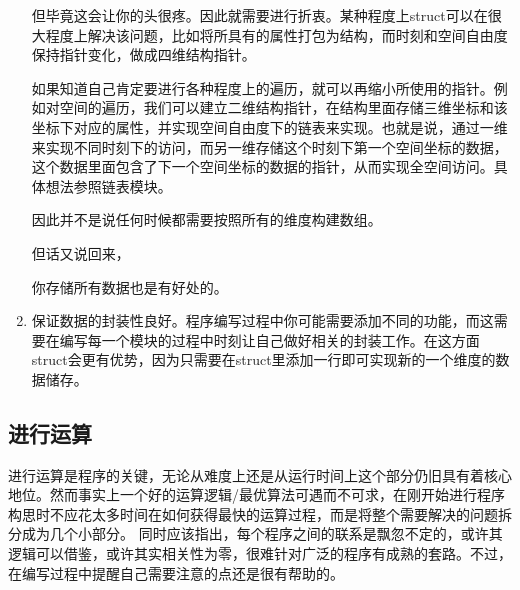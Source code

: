 \documentclass[12pt,a4paper]{article}
\begin{document}
\begin{enumerate}
但毕竟这会让你的头很疼。因此就需要进行折衷。某种程度上struct可以在很大程度上解决该问题，比如将所具有的属性打包为结构，而时刻和空间自由度保持指针变化，做成四维结构指针。

如果知道自己肯定要进行各种程度上的遍历，就可以再缩小所使用的指针。例如对空间的遍历，我们可以建立二维结构指针，在结构里面存储三维坐标和该坐标下对应的属性，并实现空间自由度下的链表来实现。也就是说，通过一维来实现不同时刻下的访问，而另一维存储这个时刻下第一个空间坐标的数据，这个数据里面包含了下一个空间坐标的数据的指针，从而实现全空间访问。具体想法参照链表模块。

因此并不是说任何时候都需要按照所有的维度构建数组。

但话又说回来，

{\Large 你存储所有数据也是有好处的。}

\item 保证数据的封装性良好。程序编写过程中你可能需要添加不同的功能，而这需要在编写每一个模块的过程中时刻让自己做好相关的封装工作。在这方面struct会更有优势，因为只需要在struct里添加一行即可实现新的一个维度的数据储存。
\end{enumerate}

\subsection{进行运算}

进行运算是程序的关键，无论从难度上还是从运行时间上这个部分仍旧具有着核心地位。然而事实上一个好的运算逻辑/最优算法可遇而不可求，在刚开始进行程序构思时不应花太多时间在如何获得最快的运算过程，而是将整个需要解决的问题拆分成为几个小部分。
同时应该指出，每个程序之间的联系是飘忽不定的，或许其逻辑可以借鉴，或许其实相关性为零，很难针对广泛的程序有成熟的套路。不过，在编写过程中提醒自己需要注意的点还是很有帮助的。
\end{document}

